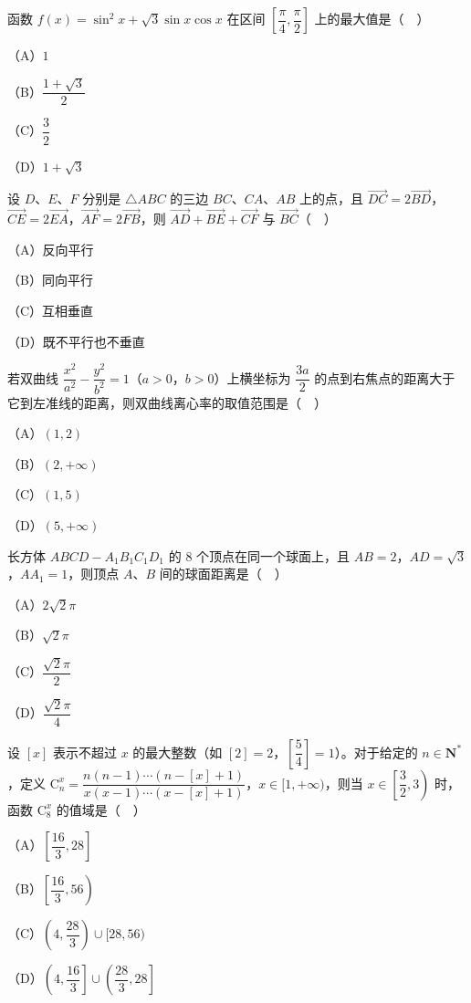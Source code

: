 \begin{question}
函数 $f(x)=\sin^2x+\sqrt3\sin x\cos x$ 在区间 $\left[\dfrac\pi4,\dfrac\pi2\right]$ 上的最大值是（　）

（A）$1$

（B）$\dfrac{1+\sqrt3}2$

（C）$\dfrac32$

（D）$1+\sqrt3$

\end{question}
\begin{question}
设 $D$、$E$、$F$ 分别是 $\triangle ABC$ 的三边 $BC$、$CA$、$AB$ 上的点，且 $\overrightarrow{DC}=2\overrightarrow{BD}$，$\overrightarrow{CE}=2\overrightarrow{EA}$，$\overrightarrow{AF}=2\overrightarrow{FB}$，则 $\overrightarrow{AD}+\overrightarrow{BE}+\overrightarrow{CF}$ 与 $\overrightarrow{BC}$（　）

（A）反向平行

（B）同向平行

（C）互相垂直

（D）既不平行也不垂直

\end{question}
\begin{question}
若双曲线 $\dfrac{x^2}{a^2}-\dfrac{y^2}{b^2}=1$（$a>0$，$b>0$）上横坐标为 $\dfrac{3a}2$ 的点到右焦点的距离大于它到左准线的距离，则双曲线离心率的取值范围是（　）

（A）$(1,2)$

（B）$(2,+\infty)$

（C）$(1,5)$

（D）$(5,+\infty)$

\end{question}
\begin{question}
长方体 $ABCD-A_1B_1C_1D_1$ 的 $8$ 个顶点在同一个球面上，且 $AB=2$，$AD=\sqrt3$，$AA_1=1$，则顶点 $A$、$B$ 间的球面距离是（　）

（A）$2\sqrt2\pi$

（B）$\sqrt2\pi$

（C）$\dfrac{\sqrt2\pi}2$

（D）$\dfrac{\sqrt2\pi}4$

\end{question}
\begin{question}
设 $[x]$ 表示不超过 $x$ 的最大整数（如 $[2]=2$，$\left[\dfrac54\right]=1$）。对于给定的 $n\in\mathbf N^*$，定义 $\mathrm C_n^x=\dfrac{n(n-1)\cdots(n-[x]+1)}{x(x-1)\cdots(x-[x]+1)}$，$x\in[1,+\infty)$，则当 $x\in\left[\dfrac32,3\right)$ 时，函数 $\mathrm C_8^x$ 的值域是（　）

（A）$\left[\dfrac{16}3,28\right]$

（B）$\left[\dfrac{16}3,56\right)$

（C）$\left(4,\dfrac{28}3\right)\cup[28,56)$

（D）$\left(4,\dfrac{16}3\right]\cup\left(\dfrac{28}3,28\right]$

\end{question}

